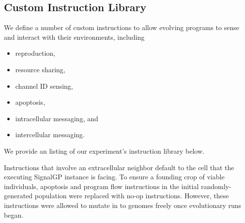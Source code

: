 \subsection{Custom Instruction Library} \label{sup:custom_instruction_library}

We define a number of custom instructions to allow evolving programs to sense and interact with their environments, including
\begin{itemize}
\item reproduction,
\item resource sharing,
\item channel ID sensing,
\item apoptosis,
\item intracellular messaging, and
\item intercellular messaging.
\end{itemize}

We provide an listing of our experiment's instruction library below.

Instructions that involve an extracellular neighbor default to the cell that the executing SignalGP instance is facing.
To ensure a founding crop of viable individuals, apoptosis and program flow instructions in the initial randomly-generated population were replaced with no-op instructions.
However, these instructions were allowed to mutate in to genomes freely once evolutionary runs began.

